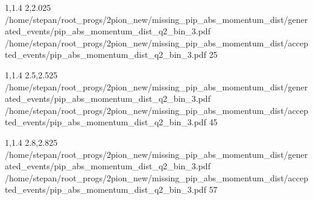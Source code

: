\MomentumDistributionSlide
    {1,1.4}
    {2,2.025}
    {/home/stepan/root_progs/2pion_new/missing_pip_abs_momentum_dist/generated_events/pip_abs_momentum_dist_q2_bin_3.pdf}
    {/home/stepan/root_progs/2pion_new/missing_pip_abs_momentum_dist/accepted_events/pip_abs_momentum_dist_q2_bin_3.pdf}
    {25}

\MomentumDistributionSlide
    {1,1.4}
    {2.5,2.525}
    {/home/stepan/root_progs/2pion_new/missing_pip_abs_momentum_dist/generated_events/pip_abs_momentum_dist_q2_bin_3.pdf}
    {/home/stepan/root_progs/2pion_new/missing_pip_abs_momentum_dist/accepted_events/pip_abs_momentum_dist_q2_bin_3.pdf}
    {45}

\MomentumDistributionSlide
    {1,1.4}
    {2.8,2.825}
    {/home/stepan/root_progs/2pion_new/missing_pip_abs_momentum_dist/generated_events/pip_abs_momentum_dist_q2_bin_3.pdf}
    {/home/stepan/root_progs/2pion_new/missing_pip_abs_momentum_dist/accepted_events/pip_abs_momentum_dist_q2_bin_3.pdf}
    {57}